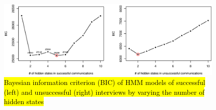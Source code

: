 \documentclass[smallextended]{svjour3}       %
\begin{document}
\begin{figure}
\centering
\includegraphics[width=1.0\textwidth]{figures/bic-vs-hidden-states.eps}
\caption{\hl{Bayesian information criterion (BIC) of HMM models of successful (left) and unsuccessful (right) interviews by varying the number of hidden states}}
\label{fig:bic}
\end{figure}
\end{document}
